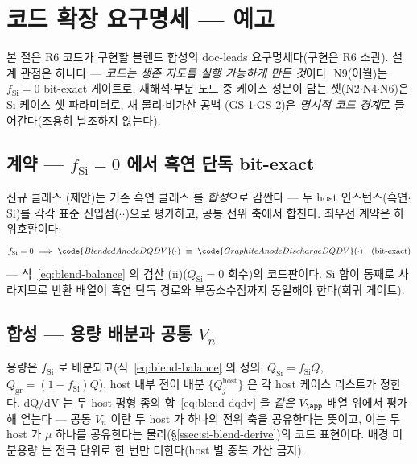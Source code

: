 \section{코드 확장 요구명세 ---  예고}\label{sec:si-code}
본 절은 R6 코드가 구현할 블렌드 합성의 doc-leads 요구명세다(구현은 R6 소관). 설계 관점은 하나다 ---
\emph{코드는 생존 지도를 실행 가능하게 만든 것}이다: N9(이월)는 $f_\mathrm{Si}{=}0$ bit-exact
게이트로, 재해석$\cdot$부분 노드 중 케이스 성분이 담는 셋(N2$\cdot$N4$\cdot$N6)은 Si 케이스 셋 파라미터로, 새 물리$\cdot$비가산 공백
(GS-1$\cdot$GS-2)은 \emph{명시적 코드 경계}로 들어간다(조용히 날조하지 않는다).

\subsection{계약 --- $f_\mathrm{Si}{=}0$ 에서 흑연 단독 bit-exact}\label{ssec:code-contract}
신규 클래스 (제안)는 기존 흑연 클래스
 를 \emph{합성}으로 감싼다 --- 두 host 인스턴스(흑연$\cdot$Si)를 각각
표준 진입점($\cdot$$\cdot$)으로 평가하고, 공통 전위 축에서
합친다. 최우선 계약은 하위호환이다:
\begin{equation}
f_\mathrm{Si}=0\ \Longrightarrow\ \code{BlendedAnodeDQDV}(\cdot)\ \equiv\ \code{GraphiteAnodeDischargeDQDV}(\cdot)
\quad(\text{bit-exact})
\label{eq:si-code-bitexact}
\end{equation}
--- 식~\eqref{eq:blend-balance} 의 검산 (ii)($Q_\mathrm{Si}{=}0$ 회수)의 코드판이다. Si 합이 통째로
사라지므로 반환 배열이 흑연 단독 경로와 부동소수점까지 동일해야 한다(회귀 게이트).

\subsection{합성 --- 용량 배분과 공통 $V_n$}\label{ssec:code-synth}
용량은 $f_\mathrm{Si}$ 로 배분되고(식~\eqref{eq:blend-balance} 의 정의: $Q_\mathrm{Si}{=}f_\mathrm{Si}Q$,
$Q_\mathrm{gr}{=}(1{-}f_\mathrm{Si})Q$), host 내부 전이 배분 $\{Q_j^{\mathrm{host}}\}$ 은 각 host 케이스
리스트가 정한다. dQ/dV 는 두 host 평형 종의 합~\eqref{eq:blend-dqdv} 을 \emph{같은} $V_\app$ 배열
위에서 평가해 얻는다 --- 공통 $V_n$ 이란 두 host 가 하나의 전위 축을 공유한다는 뜻이고, 이는 두 host 가
$\mu$ 하나를 공유한다는 물리(\S\ref{ssec:si-blend-derive})의 코드 표현이다. 배경 미분용량  는
전극 단위로 한 번만 더한다(host 별 중복 가산 금지).

